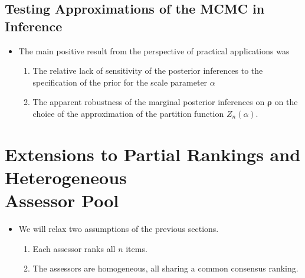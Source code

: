 \documentclass[12pt]{article}
\begin{document}
\subsection{Testing Approximations of the MCMC in Inference}
\begin{itemize}
    \item The main positive result from the perspective of practical applications was \begin{enumerate}
        \item The relative lack of sensitivity of the posterior inferences to the specification of the prior for the scale parameter $\alpha$
        \item The apparent robustness of the marginal posterior inferences on $\boldsymbol{\rho}$ on the choice of the approximation of the partition function $Z_n(\alpha)$.
    \end{enumerate}
\end{itemize}
\section{Extensions to Partial Rankings and Heterogeneous \\ Assessor Pool}
\begin{itemize}
    \item We will relax two assumptions of the previous sections.
    \begin{enumerate}
        \item Each assessor ranks all $n$ items. 
        \item The assessors are homogeneous, all sharing a common consensus ranking.
    \end{enumerate}
\end{itemize}
\end{document}
